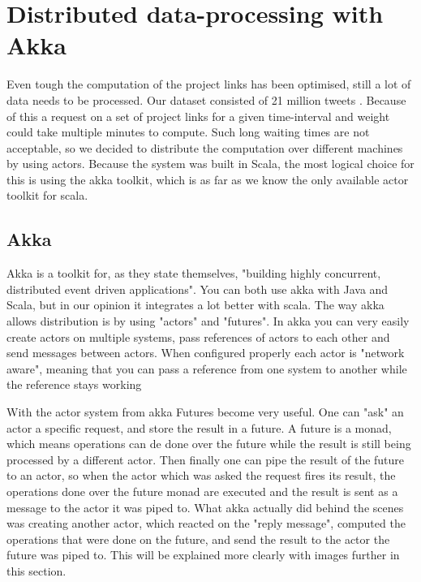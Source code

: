\documentclass[10pt,a4paper]{article}
\begin{document}
\section{Distributed data-processing with Akka}\label{sec:distributed}

Even tough the computation of the project links has been optimised, still a lot of data needs to be processed. Our dataset consisted of 21 million tweets . Because of this a request on a set of project links for a given time-interval and weight could take multiple minutes to compute. Such long waiting times are not acceptable, so we decided to distribute the computation over different machines by using actors. Because the system was built in Scala, the most logical choice for this is using the akka toolkit, which is as far as we know the only available actor toolkit for scala.

\subsection{Akka}

Akka is a toolkit for, as they state themselves, "building highly concurrent, distributed event driven applications". You can both use akka with Java and Scala, but in our opinion it integrates a lot better with scala. The way akka allows distribution is by using "actors" and "futures". In akka you can very easily create actors on multiple systems, pass references of actors to each other and send messages between actors. When configured properly each actor is "network aware", meaning that you can pass a reference from one system to another while the reference stays working

With the actor system from akka Futures become very useful. One can "ask" an actor a specific request, and store the result in a future. A future is a monad, which means operations can de done over the future while the result is still being processed by a different actor.  Then finally one can pipe the result of the future to an actor, so when the actor which was asked the request fires its result, the operations done over the future monad are executed and the result is sent as a message to the actor it was piped to. What akka actually did behind the scenes was creating another actor, which reacted on the "reply message", computed the operations that were done on the future, and send the result to the actor the future was piped to. This will be explained more clearly with images further in this section.
\end{document}
